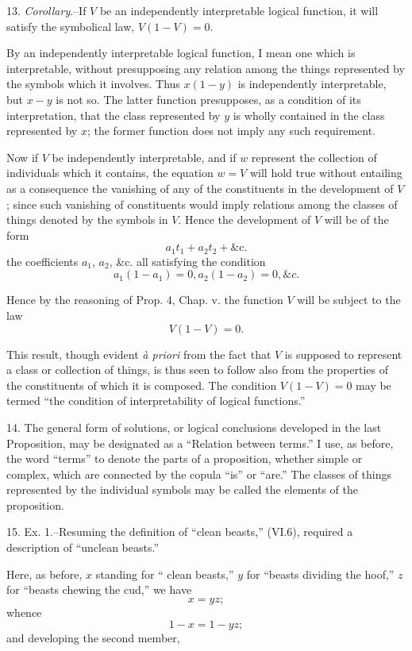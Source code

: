 \documentclass[oneside]{book}
\begin{document}
13. \textit{Corollary}.--If $V$ be an independently interpretable logical
function, it will satisfy the symbolical law, $V(1-V) = 0$.

By an independently interpretable logical function, I mean
one which is interpretable, without presupposing any relation
among the things represented by the symbols which it involves.
Thus $x(1-y)$ is independently interpretable, but $x-y$ is not so.
The latter function presupposes, as a condition of its interpretation,
that the class represented by $y$ is wholly contained in the class
represented by $x$; the former function does not imply any such requirement.

Now if $V$ be independently interpretable, and if $w$ represent
the collection of individuals which it contains, the equation
$w = V$ will hold true without entailing as a consequence the vanishing
of any of the constituents in the development of $V$;
since such vanishing of constituents would imply relations among
the classes of things denoted by the symbols in $V$. Hence the
development of $V$ will be of the form
\[
a_1t_1+a_2t_2+\textrm{\&c}.
\]
the coefficients $a_1$, $a_2$, \&c. all satisfying the condition
\[
a_1(1-a_1) = 0, a_2 (1-a_2) = 0, \&c.
\]

Hence by the reasoning of Prop. 4, Chap. v. the function $V$ will
be subject to the law
\[
V(1-V) = 0.
\]

This result, though evident \textit{\`{a} priori} from the fact that $V$ is supposed
to represent a class or collection of things, is thus seen to follow also from the properties of the constituents of which it is
composed. The condition $V(1-V) = 0$ may be termed ``the
condition of interpretability of logical functions.''

14. The general form of solutions, or logical conclusions developed
in the last Proposition, may be designated as a ``Relation
between terms.'' I use, as before, the word ``terms'' to denote
the parts of a proposition, whether simple or complex, which are
connected by the copula ``is'' or ``are.'' The classes of things represented
by the individual symbols may be called the elements
of the proposition.

15. Ex. 1.--Resuming the definition of ``clean beasts,''
(VI.6), required a description of ``unclean beasts.''

Here, as before, $x$ standing for `` clean beasts,'' $y$ for ``beasts
dividing the hoof,'' $z$ for ``beasts chewing the cud,'' we have
\begin{equation}
x = yz;
\end{equation}
whence
\[
1-x = 1-yz ;
\]
and developing the second member,
\end{document}
